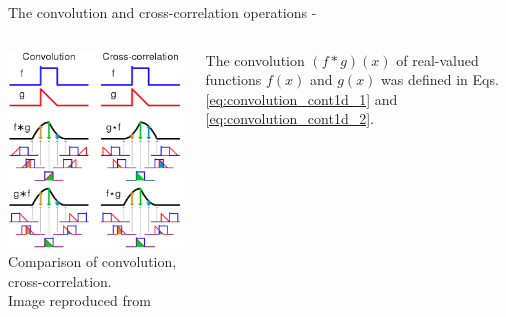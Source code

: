 \begin{frame}[t,allowframebreaks]{The convolution and cross-correlation operations -}
    \begin{columns}
        \begin{column}{0.45\textwidth}
         \begin{center}
            \includegraphics[width=0.99\textwidth]
            {./images/convolution/wikipedia_comparison_conv_corr_02.png}\\
         {\scriptsize 
          Comparison of convolution, cross-correlation.\\
          \color{col:attribution} 
          Image reproduced from \cite{Wikipedia:Convolution}}\\
          \end{center}
        \end{column}
        \begin{column}{0.55\textwidth}
            The \gls{convolution} $(f \ast g) (x)$ of real-valued functions 
            $f(x)$ and $g(x)$ was defined in 
            Eqs. \ref{eq:convolution_cont1d_1} and \ref{eq:convolution_cont1d_2}.\\
            \vspace{0.2cm}

\end{column}
\end{columns}
\end{frame}
